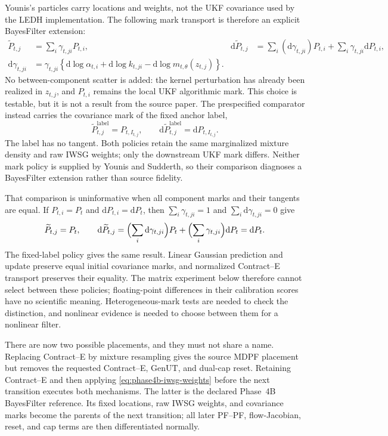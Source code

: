 \documentclass[11pt]{article}
\newcommand{\dd}{\mathrm{d}}
\newcommand{\GenUT}{\ensuremath{\mathrm{GenUT}}}
\begin{document}
Younis's particles carry locations and weights, not the UKF covariance used by
the LEDH implementation.  The following mark transport is therefore an
explicit BayesFilter extension:
\begin{align}
 \widetilde P_{t,j}
   &=\sum_i\gamma_{t,ji}P_{t,i}, &
 \dd\widetilde P_{t,j}
   &=\sum_i(\dd\gamma_{t,ji})P_{t,i}
     +\sum_i\gamma_{t,ji}\dd P_{t,i},\\
 \dd\gamma_{t,ji}
   &=\gamma_{t,ji}\left\{
       \dd\log\alpha_{t,i}+\dd\log k_{t,ji}
       -\dd\log m_{t,\theta}(z_{t,j})\right\}.
 \label{eq:phase4b-covariance-mark}
\end{align}
No between-component scatter is added: the kernel perturbation has already
been realized in $z_{t,j}$, and $P_{t,i}$ remains the local UKF algorithmic
mark.  This choice is testable, but it is not a result from the source paper.
The prespecified comparator instead carries the covariance mark of the fixed
anchor label,
\begin{equation}
 \widetilde P_{t,j}^{\mathrm{label}}=P_{t,I_{t,j}},\qquad
 \dd\widetilde P_{t,j}^{\mathrm{label}}=\dd P_{t,I_{t,j}}.
 \label{eq:phase4b-selected-mark}
\end{equation}
The label has no tangent.  Both policies retain the same marginalized mixture
density and raw IWSG weights; only the downstream UKF mark differs.  Neither
mark policy is supplied by Younis and Sudderth, so their comparison diagnoses a
BayesFilter extension rather than source fidelity.

That comparison is uninformative when all component marks and their tangents
are equal.  If $P_{t,i}=P_t$ and $\dd P_{t,i}=\dd P_t$, then
$\sum_i\gamma_{t,ji}=1$ and $\sum_i\dd\gamma_{t,ji}=0$ give
\begin{equation}
 \widetilde P_{t,j}=P_t,\qquad
 \dd\widetilde P_{t,j}
   =\Bigl(\sum_i\dd\gamma_{t,ji}\Bigr)P_t
      +\Bigl(\sum_i\gamma_{t,ji}\Bigr)\dd P_t
   =\dd P_t.
 \label{eq:phase4b-equal-marks}
\end{equation}
The fixed-label policy gives the same result.  Linear Gaussian prediction and
update preserve equal initial covariance marks, and normalized Contract--E
transport preserves their equality.  The matrix experiment below therefore
cannot select between these policies; floating-point differences in their
calibration scores have no scientific meaning.  Heterogeneous-mark tests are
needed to check the distinction, and nonlinear evidence is needed to choose
between them for a nonlinear filter.

There are now two possible placements, and they must not share a name.
Replacing Contract--E by mixture resampling gives the source MDPF placement
but removes the requested Contract--E, \GenUT{}, and dual-cap reset.  Retaining
Contract--E and then applying \eqref{eq:phase4b-iwsg-weights} before the next
transition executes both mechanisms.  The latter is the declared Phase~4B
BayesFilter reference.  Its fixed locations, raw IWSG weights, and covariance
marks become the parents of the next transition; all later PF--PF,
flow-Jacobian, reset, and cap terms are then differentiated normally.
\end{document}
